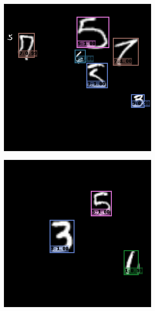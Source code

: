 \begin{figure}
\begin{subfigure}[b]{0.49\textwidth}
  \end{subfigure}
  ~
  \begin{subfigure}[b]{0.49\textwidth}
    \centering
    \includegraphics[width=\textwidth]{figures/2.png}
  \end{subfigure}
  \begin{subfigure}[b]{0.49\textwidth}
    \centering
    \includegraphics[width=\textwidth]{figures/3.png}

\end{subfigure}
\end{figure}
